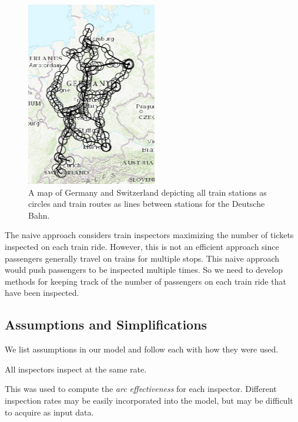 \documentclass[11pt]{article}
\begin{document}
\begin{figure}[t]
    \centering
    \includegraphics[scale=0.7]{pics/GermanyTrainMap.png}
    \caption{A map of Germany and Switzerland depicting all train stations as circles and train routes as lines between stations for the Deutsche Bahn.}
    \label{fig:map}
\end{figure}

\par The naive approach considers train inspectors maximizing the number of tickets inspected on each train ride. However, this is not an efficient approach since passengers generally travel on trains for multiple stops. This naive approach would push passengers to be inspected multiple times. So we need to develop methods for keeping track of the number of passengers on each train ride that have been inspected.

\subsection{Assumptions and Simplifications}

We list assumptions in our model and follow each with how they were used.

\begin{assump}
All inspectors inspect at the same rate.
\end{assump}
This was used to compute the \textit{arc effectiveness} for each inspector. Different inspection rates may be easily incorporated into the model, but may be difficult to acquire as input data.
\end{document}
